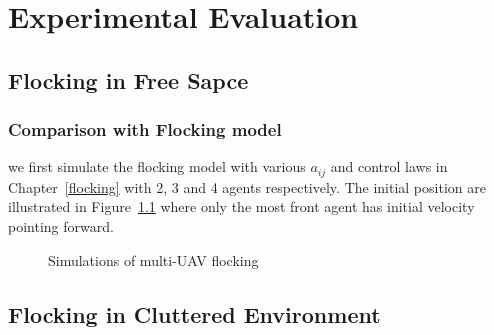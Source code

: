 \chapter{Experimental Evaluation}\label{experiment}

\section{Flocking in Free Sapce}

\subsection{Comparison with Flocking model}

we first simulate the flocking model with various $a_{ij}$ and control laws in Chapter~\ref{flocking} with 2, 3 and 4 agents respectively. The initial position are illustrated in Figure~\ref{fig:simulate_flocking} where only the most front agent has initial velocity pointing forward.
\begin{figure}[htb]
	\centering
	\caption{Simulations of multi-UAV flocking}\label{fig:simulate_flocking}
\end{figure}

\section{Flocking in Cluttered Environment}